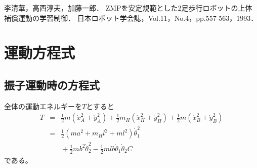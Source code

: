 \documentclass[technicalreport]{ieicej}
\begin{document}
\begin{thebibliography}{99}
  李清華，高西淳夫，加藤一郎．
  ZMPを安定規範とした2足歩行ロボットの上体補償運動の学習制御．
  日本ロボット学会誌，Vol.11，No.4，pp.557-563，1993．

\end{thebibliography}

%
%
\appendix
\section{運動方程式}

\subsection{振子運動時の方程式}
\label{sec:undou}

全体の運動エネルギーを$T$とすると
\begin{eqnarray}
    T &=& \frac{1}{2}  m(\dot{x}_A^2 + \dot{y}_A^2)
       + \frac{1}{2}m_H(\dot{x}_H^2 + \dot{y}_H^2)
       + \frac{1}{2}  m(\dot{x}_B^2 + \dot{y}_B^2)\nonumber\\
      &=& \frac{1}{2}(ma^2 + m_Hl^2 + ml^2)\dot{\theta}_1^2\nonumber\\
      & & \mbox{} + \frac{1}{2}mb^2\dot{\theta}_2^2
       - \frac{1}{2}mlb\dot{\theta}_1\dot{\theta}_2C
\end{eqnarray}
である。
\end{document}
